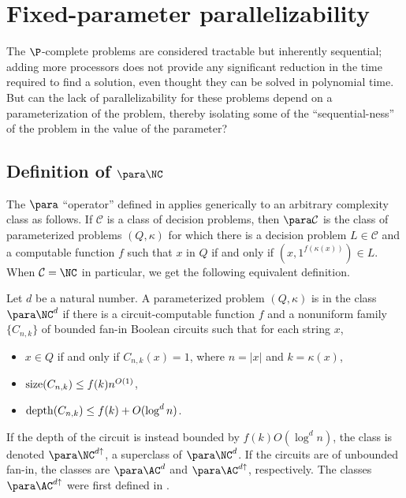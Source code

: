 \section{Fixed-parameter parallelizability}
\label{sec:pcompletefpp}

The $\P$-complete problems are considered tractable but inherently sequential; adding more processors does not provide any significant reduction in the time required to find a solution, even thought they can be solved in polynomial time.
But can the lack of parallelizability for these problems depend on a parameterization of the problem, thereby isolating some of the ``sequential-ness'' of the problem in the value of the parameter?

\subsection{Definition of \texorpdfstring{$\para \NC$}{paraNC}}

The $\para$ ``operator'' defined in \autocite{fg03} applies generically to an arbitrary complexity class as follows.
If $\mathcal{C}$ is a class of decision problems, then $\para \mathcal{C}$ is the class of parameterized problems $(Q, \kappa)$ for which there is a decision problem $L \in \mathcal{C}$ and a computable function $f$ such that $x$ in $Q$ if and only if $(x, 1^{f(\kappa(x))}) \in L$.
When $\mathcal{C} = \NC$ in particular, we get the following equivalent definition.

\begin{definition}[$\para \NC^d$]
  Let $d$ be a natural number.
  A parameterized problem $(Q, \kappa)$ is in the class $\para \NC^d$ if there is a circuit-computable function $f$ and a nonuniform family $\{C_{n, k}\}$ of bounded fan-in Boolean circuits such that for each string $x$,
  \begin{itemize}
  \item $x \in Q$ if and only if $C_{n, k}(x) = 1$, where $n = |x|$ and $k = \kappa(x)$,
  \item $\operatorname{size}(C_{n, k}) \leq f(k) n^{O(1)}$,
  \item $\operatorname{depth}(C_{n, k}) \leq f(k) + O(\log^d n)$.
  \end{itemize}
\end{definition}

If the depth of the circuit is instead bounded by $f(k) O(\log^d n)$, the class is denoted $\para \NC^{d \uparrow}$, a superclass of $\para \NC^d$.
If the circuits are of unbounded fan-in, the classes are $\para \AC^d$ and $\para \AC^{d \uparrow}$, respectively.
The classes $\para \AC^{d \uparrow}$ were first defined in \autocite{bst15}.

